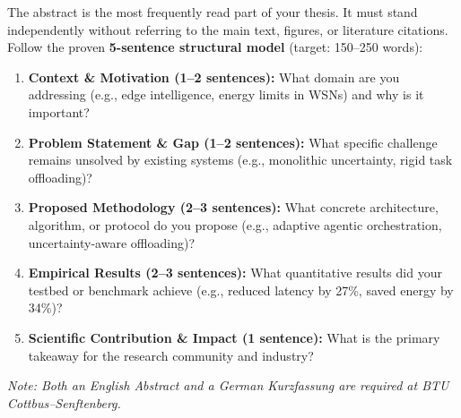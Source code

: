 
\begin{tcolorbox}[
    colback=white,
    colframe=btuDarkGray,
    title={\textbf{Student Writing Guide: Crafting an Executive Abstract}},
    fonttitle=\bfseries\sffamily,
    sharp corners,
    boxrule=0.8pt
]
\small
The abstract is the most frequently read part of your thesis. It must stand independently without referring to the main text, figures, or literature citations. Follow the proven \textbf{5-sentence structural model} (target: 150--250 words):
\begin{enumerate}[leftmargin=*,itemsep=1pt,topsep=2pt]
    \item \textbf{Context \& Motivation (1--2 sentences):} What domain are you addressing (e.g., edge intelligence, energy limits in WSNs) and why is it important?
    \item \textbf{Problem Statement \& Gap (1--2 sentences):} What specific challenge remains unsolved by existing systems (e.g., monolithic uncertainty, rigid task offloading)?
    \item \textbf{Proposed Methodology (2--3 sentences):} What concrete architecture, algorithm, or protocol do you propose (e.g., adaptive agentic orchestration, uncertainty-aware offloading)?
    \item \textbf{Empirical Results (2--3 sentences):} What quantitative results did your testbed or benchmark achieve (e.g., reduced latency by 27\%, saved energy by 34\%)?
    \item \textbf{Scientific Contribution \& Impact (1 sentence):} What is the primary takeaway for the research community and industry?
\end{enumerate}
\textit{Note: Both an English Abstract and a German Kurzfassung are required at BTU Cottbus--Senftenberg.}
\end{tcolorbox}

\vspace{0.4cm}

